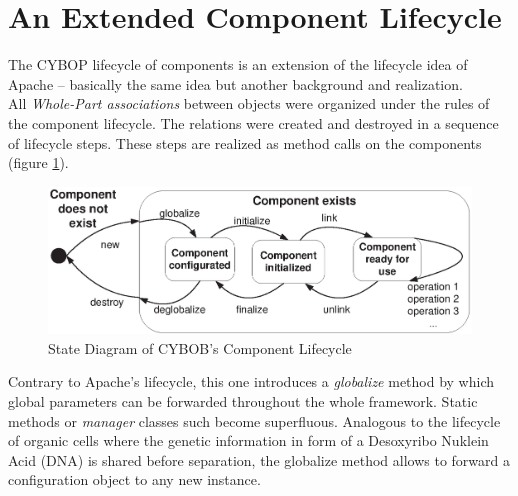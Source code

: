 %
%
%
%
%
%
%

\section{An Extended Component Lifecycle}
\label{an_extended_component_lifecycle_heading}

The CYBOP lifecycle of components is an extension of the lifecycle idea of
Apache -- basically the same idea but another background and realization.\\
All \emph{Whole-Part associations} between objects were organized under the
rules of the component lifecycle. The relations were created and destroyed in
a sequence of lifecycle steps. These steps are realized as method calls on the
components (figure \ref{component_lifecycle_figure}).

\begin{figure}[ht]
    \begin{center}
       \includegraphics[scale=0.4]{eps/lebenszyklusEng.eps}
       \caption{State Diagram of CYBOB's Component Lifecycle}
       \label{component_lifecycle_figure}
    \end{center}
\end{figure}

Contrary to Apache's lifecycle, this one introduces a \emph{globalize} method
by which global parameters can be forwarded throughout the whole framework.
Static methods or \emph{manager} classes such become superfluous.
Analogous to the lifecycle of organic cells where the genetic information in form
of a Desoxyribo Nuklein Acid (DNA) is shared before separation, the globalize
method allows to forward a configuration object to any new instance.

